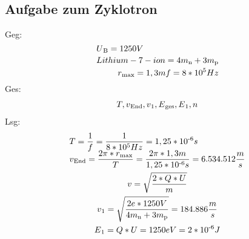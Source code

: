 \documentclass{scrartcl}
\begin{document}
        \subsection*{Aufgabe zum Zyklotron}
        Geg:
        \begin{equation}
            \begin{multlined}
                U\textsubscript{B} = 1250V \\
                Lithium-7-ion=4m\textsubscript{n}+3m\textsubscript{p} \\
                r\textsubscript{$\max$} = 1,3m
                f=8*10^5 Hz
            \end{multlined}
        \end{equation}
        Ges:
        \begin{equation}
            \begin{multlined}
                T,
                v\textsubscript{End},
                v\textsubscript{1},
                E\textsubscript{ges},
                E\textsubscript{1},
                n
            \end{multlined}
        \end{equation}
        Lsg:
        \begin{equation}
            \begin{multlined}
                T = \frac{1}{f} = \frac{1}{8*10^5 Hz} = 1,25 * 10\textsuperscript{-6}s \\
                v\textsubscript{End} = \frac{2\pi*r\textsubscript{$\max$}}{T} = \frac{2\pi*1,3m}{1,25 * 10\textsuperscript{-6}s} = 6.534.512 \frac{m}{s} \\
                v=\sqrt{\frac{2*Q*U}{m}} \\
                v\textsubscript{1}=\sqrt{\frac{2e*1250V}{4m\textsubscript{n}+3m\textsubscript{p}}} = 184.886 \frac{m}{s} \\
                E\textsubscript{1}= Q*U = 1250 eV = 2*10\textsuperscript{-6} J \\
            \end{multlined}
        \end{equation}
\end{document}
